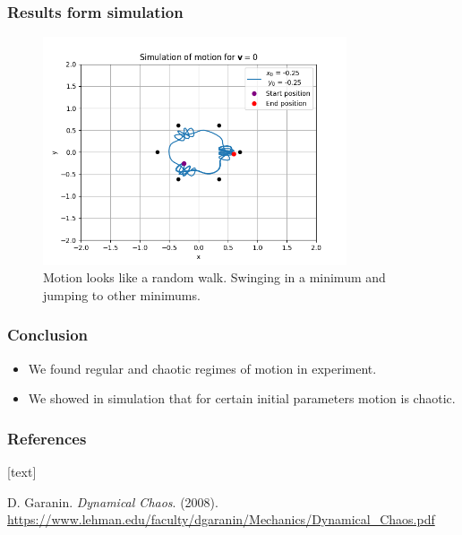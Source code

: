 \documentclass{beamer}
\begin{document}
\begin{frame}

\frametitle{Results form simulation}

\begin{figure}[H]
	\centering
	\includegraphics[width=0.8\textwidth]{motion 15.png}
	  \caption{Motion looks like a random walk. Swinging in a minimum and jumping to other minimums.}
\end{figure}

\end{frame}


\begin{frame}
\frametitle{Conclusion}

\begin{itemize}
\item We found regular and chaotic regimes of motion in experiment.
\item We showed in simulation that for certain initial parameters motion is chaotic.

\end{itemize}

\end{frame}


\begin{frame}

\frametitle{References}

[text]

\begin{thebibliography}{9}

D. Garanin. \textit{Dynamical Chaos}. (2008). \url{https://www.lehman.edu/faculty/dgaranin/Mechanics/Dynamical_Chaos.pdf}


\end{thebibliography}

\end{frame}

\end{document}
